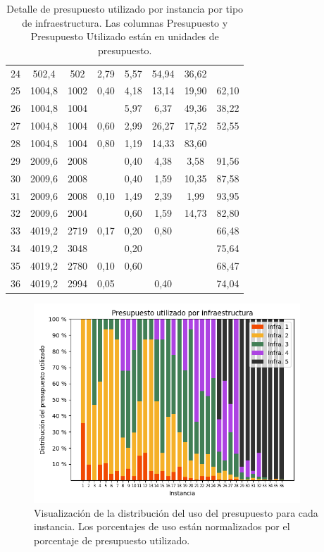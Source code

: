 \documentclass{article}
\begin{document}
\begin{table}
\begin{tabular}{cccccccc}
        24 & 502,4 & 502 & 2,79 & 5,57 & 54,94 & 36,62 &  \\
        25 & 1004,8 & 1002 & 0,40 & 4,18 & 13,14 & 19,90 & 62,10 \\
        26 & 1004,8 & 1004 &  & 5,97 & 6,37 & 49,36 & 38,22 \\
        27 & 1004,8 & 1004 & 0,60 & 2,99 & 26,27 & 17,52 & 52,55 \\
        28 & 1004,8 & 1004 & 0,80 & 1,19 & 14,33 & 83,60 &  \\
        29 & 2009,6 & 2008 &  & 0,40 & 4,38 & 3,58 & 91,56 \\
        30 & 2009,6 & 2008 &  & 0,40 & 1,59 & 10,35 & 87,58 \\
        31 & 2009,6 & 2008 & 0,10 & 1,49 & 2,39 & 1,99 & 93,95 \\
        32 & 2009,6 & 2004 &  & 0,60 & 1,59 & 14,73 & 82,80 \\
        33 & 4019,2 & 2719 & 0,17 & 0,20 & 0,80 &  & 66,48 \\
        34 & 4019,2 & 3048 &  & 0,20 &  &  & 75,64 \\
        35 & 4019,2 & 2780 & 0,10 & 0,60 &  &  & 68,47 \\
        36 & 4019,2 & 2994 & 0,05 &  & 0,40 &  & 74,04 \\
        \bottomrule
    \end{tabular}
      \caption{Detalle de presupuesto utilizado por instancia por tipo de infraestructura. Las columnas Presupuesto y Presupuesto Utilizado están en unidades de presupuesto.} \label{table:sensibilitybudgetusage}
  \end{table}

  \begin{figure}[h!]
    \centering
    \includegraphics[width=10cm]{../resources/budget_use_by_infra.png}
      \caption{Visualización de la distribución del uso del presupuesto para cada instancia. Los porcentajes de uso están normalizados por el porcentaje de presupuesto utilizado.}
    \label{fig:sensibilitybudgetusage}
  \end{figure}
\end{document}
